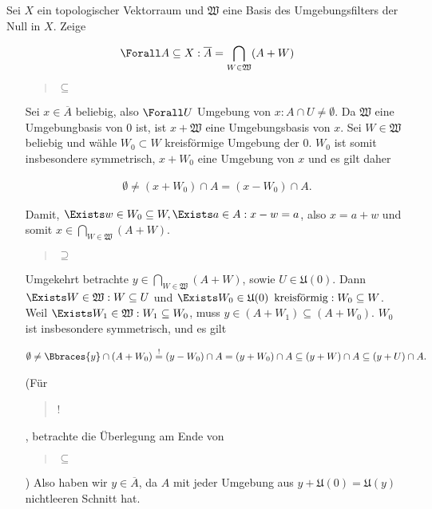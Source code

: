 \begin{exercise}

Sei $X$ ein topologischer Vektorraum und $\mathfrak{W}$ eine Basis des Umgebungsfilters der Null in $X$.
Zeige

\begin{align*}
  \Forall A \subseteq X:
  \overline{A}
  =
  \bigcap_{W \in \mathfrak{W}} (A + W)
\end{align*}

\end{exercise}

\begin{solution}

\phantom{}

\begin{itemize}

  \item[\blockquote{$\subseteq$}:]
  Sei $x \in \overline{A}$ beliebig, also $\Forall U$ Umgebung von $x: A \cap U \neq \emptyset$.
  Da $\mathfrak{W}$ eine Umgebungbasis von $0$ ist, ist $x + \mathfrak{W}$ eine Umgebungsbasis von $x$.
  Sei $W \in \mathfrak{W}$ beliebig und wähle $W_0 \subset W$ kreisförmige Umgebung der $0$.
  $W_0$ ist somit insbesondere symmetrisch, $x + W_0$ eine Umgebung von $x$ und es gilt daher

  \begin{align*}
    \emptyset
    \neq
    (x + W_0) \cap A
    =
    (x - W_0) \cap A.
  \end{align*}

  Damit, $\Exists w \in W_0 \subseteq W, \Exists a \in A: x - w = a$, also $x = a + w$ und somit $x \in \bigcap_{W \in \mathfrak{W}}(A + W)$.

  \item[\blockquote{$\supseteq$}:]
  Umgekehrt betrachte $y \in \bigcap_{W \in \mathfrak{W}}(A + W)$, sowie $ U \in \mathfrak{U}(0)$.
  Dann $\Exists W \in \mathfrak{W}: W \subseteq U$ und $\Exists W_0 \in \mathfrak{U}(0) \enspace \text{kreisförmig}: W_0 \subseteq W$.
  Weil $\Exists W_1 \in \mathfrak{W}: W_1 \subseteq W_0$, muss $y \in (A + W_1) \subseteq (A + W_0)$.
  $W_0$ ist insbesondere symmetrisch, und es gilt

  \begin{align*}
    \emptyset
    \neq
    \Bbraces{y} \cap (A + W_0)
    \stackrel{!}{=}
    (y - W_0) \cap A = (y + W_0) \cap A
    \subseteq
    (y + W) \cap A
    \subseteq
    (y + U) \cap A.
  \end{align*}

  (Für \blockquote{!}, betrachte die Überlegung am Ende von \blockquote{$\subseteq$}.)
  Also haben wir $y \in \overline{A}$, da $A$ mit jeder Umgebung aus $y + \mathfrak{U}(0) = \mathfrak{U}(y)$ nichtleeren Schnitt hat.

\end{itemize}

\end{solution}
